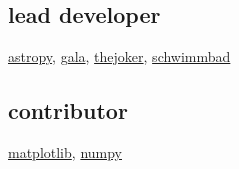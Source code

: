 \documentclass[letterpaper,12pt]{deedy-resume}
\begin{document}
\begin{minipage}[t]{0.32\textwidth}
\subsection{lead developer}
\href{https://github.com/adrn/astropy}{astropy},
\href{https://github.com/adrn/gala}{gala},
\href{https://github.com/adrn/thejoker}{thejoker},
\href{https://github.com/adrn/schwimmbad}{schwimmbad}

\sectionspace %

\subsection{contributor}
\href{https://github.com/matplotlib/matplotlib}{matplotlib},
\href{https://github.com/numpy/numpy}{numpy}

\sectionspace %






\end{minipage} %
\hfill
%
%
\end{document}
